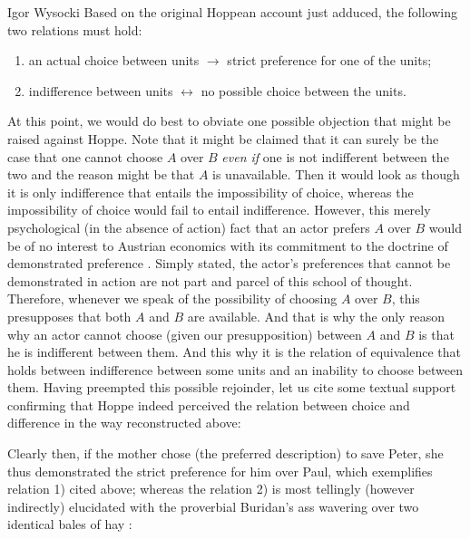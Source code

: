 \begin{artengenv}{Igor Wysocki}
Based on the original Hoppean account just adduced, the following two relations must hold:

\begin{enumerate}
\item an actual choice between units $\rightarrow$ strict preference for one of the units;
\item indifference between units $\leftrightarrow$ no possible choice between the units.
\end{enumerate}
At this point, we would do best to obviate one possible objection that might be raised against Hoppe. Note that it might be claimed that it can surely be the case that one cannot choose $A$ over $B$ \textit{even if} one is not indifferent between the two and the reason might be that $A$ is unavailable. Then it would look as though it is only indifference that entails the impossibility of choice, whereas the impossibility of choice would fail to entail indifference. However, this merely psychological (in the absence of action) fact that an actor prefers $A$ over $B$ would be of no interest to Austrian economics with its commitment to the doctrine of demonstrated preference
\parencite[see \textit{inter alia}][]{rothbard_toward_2011}. %
 Simply stated, the actor's preferences that cannot be demonstrated in action are not part and parcel of this school of thought. Therefore, whenever we speak of the possibility of choosing $A$ over $B$, this presupposes that both $A$ and $B$ are available. And that is why the only reason why an actor cannot choose (given our presupposition) between $A$ and $B$ is that he is indifferent between them. And this why it is the relation of equivalence that holds between indifference between some units and an inability to choose between them. Having preempted this possible rejoinder, let us cite some textual support confirming that Hoppe 
\parencite*[][p.91]{hoppe_must_2005} %
 indeed perceived the relation between choice and difference in the way reconstructed above:

Clearly then, if the mother chose (the preferred description) to save Peter, she thus demonstrated the strict preference for him over Paul, which exemplifies relation 1) cited above; whereas the relation 2) is most tellingly (however indirectly) elucidated with the proverbial Buridan's ass wavering over two identical bales of hay
\parencite[][p.91]{hoppe_must_2005}:%



\end{artengenv}
